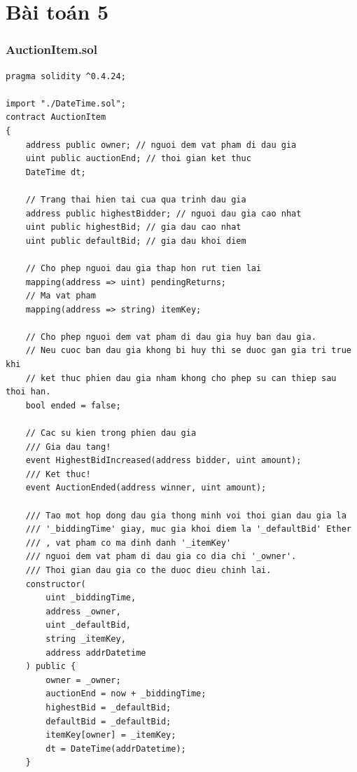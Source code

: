 \documentclass[a4paper]{article}
\begin{document}
\newpage


\section{Bài toán 5}
\begin{frame}
\frametitle{AuctionItem.sol}
\begin{lstlisting}[basicstyle=\small]
pragma solidity ^0.4.24;

import "./DateTime.sol";
contract AuctionItem
{
    address public owner; // nguoi dem vat pham di dau gia
    uint public auctionEnd; // thoi gian ket thuc
    DateTime dt;

    // Trang thai hien tai cua qua trinh dau gia
    address public highestBidder; // nguoi dau gia cao nhat
    uint public highestBid; // gia dau cao nhat
    uint public defaultBid; // gia dau khoi diem

    // Cho phep nguoi dau gia thap hon rut tien lai
    mapping(address => uint) pendingReturns;
    // Ma vat pham
    mapping(address => string) itemKey;

    // Cho phep nguoi dem vat pham di dau gia huy ban dau gia.
    // Neu cuoc ban dau gia khong bi huy thi se duoc gan gia tri true khi
    // ket thuc phien dau gia nham khong cho phep su can thiep sau thoi han.
    bool ended = false;

    // Cac su kien trong phien dau gia
    /// Gia dau tang!
    event HighestBidIncreased(address bidder, uint amount);
    /// Ket thuc!
    event AuctionEnded(address winner, uint amount);

    /// Tao mot hop dong dau gia thong minh voi thoi gian dau gia la
    /// '_biddingTime' giay, muc gia khoi diem la '_defaultBid' Ether
    /// , vat pham co ma dinh danh '_itemKey'
    /// nguoi dem vat pham di dau gia co dia chi '_owner'.
    /// Thoi gian dau gia co the duoc dieu chinh lai.
    constructor(
        uint _biddingTime,
        address _owner,
        uint _defaultBid,
        string _itemKey,
        address addrDatetime
    ) public {
        owner = _owner;
        auctionEnd = now + _biddingTime;
        highestBid = _defaultBid;
        defaultBid = _defaultBid;
        itemKey[owner] = _itemKey;
        dt = DateTime(addrDatetime);
    }


\end{lstlisting}
\end{frame}
\end{document}
